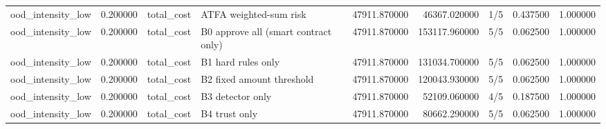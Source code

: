 \begin{tabular}{lrllrrlrr}
ood\_intensity\_low & 0.200000 & total\_cost & ATFA weighted-sum risk & 47911.870000 & 46367.020000 & 1/5 & 0.437500 & 1.000000 \\
ood\_intensity\_low & 0.200000 & total\_cost & B0 approve all (smart contract only) & 47911.870000 & 153117.960000 & 5/5 & 0.062500 & 1.000000 \\
ood\_intensity\_low & 0.200000 & total\_cost & B1 hard rules only & 47911.870000 & 131034.700000 & 5/5 & 0.062500 & 1.000000 \\
ood\_intensity\_low & 0.200000 & total\_cost & B2 fixed amount threshold & 47911.870000 & 120043.930000 & 5/5 & 0.062500 & 1.000000 \\
ood\_intensity\_low & 0.200000 & total\_cost & B3 detector only & 47911.870000 & 52109.060000 & 4/5 & 0.187500 & 1.000000 \\
ood\_intensity\_low & 0.200000 & total\_cost & B4 trust only & 47911.870000 & 80662.290000 & 5/5 & 0.062500 & 1.000000 \\
\bottomrule
\end{tabular}
